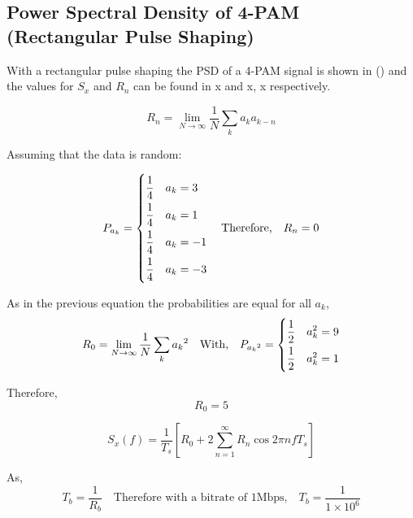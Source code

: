\subsection{Power Spectral Density of 4-PAM (Rectangular Pulse Shaping)}

With a rectangular pulse shaping the PSD of a 4-PAM signal is shown in () and the values for $S_x$ 
and $R_n$ can be found in x and x, x respectively.

\begin{equation}
    \label{eqn:rn}
    R_n=\lim_{N\to\infty} \frac{1}{N} \sum_{k}a_k a_{k-n}
\end{equation}

Assuming that the data is random:

\begin{equation}
    \label{eqn:ak-dist}
    P_{a_k} = 
    \begin{dcases}
        \frac{1}{4} \quad a_k = 3 \\
        \frac{1}{4} \quad a_k = 1 \\
        \frac{1}{4} \quad a_k = -1 \\
        \frac{1}{4} \quad a_k = -3
    \end{dcases}
    \quad \textrm{Therefore,} \quad R_n = 0
\end{equation}

As in the previous equation the probabilities are equal for all $a_k$,
\begin{equation}
    \label{eqn:r0}
    R_0 = \lim_{N\to\infty} \frac{1}{N} \sum_{k} {a_{k}}^2 \quad \textrm{With,} \quad P_{{a_{k}}^2} = 
    \begin{dcases}
        \frac{1}{2} \quad a_k^2 = 9 \\
        \frac{1}{2} \quad a_k^2 = 1
    \end{dcases}
\end{equation}

\newpage

Therefore,
\begin{equation}
    \label{eqn:r0-value}
    R_0 = 5
\end{equation}

\begin{equation}
    \label{eqn:sx}
     S_x(f) = \frac{1}{T_s}[R_0 + 2 \sum_{n=1}^{\infty}{R_n \cos 2 \pi n f T_s}]
\end{equation}

As,
\begin{equation}
    \label{eqn:ts}
    T_b = \frac{1}{R_b} \quad \textrm{Therefore with a bitrate of 1Mbps,} \quad T_b = \frac{1}{1 \times 10^6}
\end{equation}

